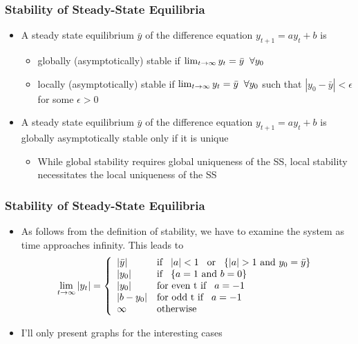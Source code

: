 \documentclass[11pt]{beamer}
\begin{document}
\begin{frame}
\frametitle{Stability of Steady-State Equilibria}
\begin{itemize}\itemsep2ex
	\item A steady state equilibrium $\bar{y}$ of the difference equation $y_{t+1} = a y_t + b$ is
	\begin{itemize}\itemsep2ex
		\item globally (asymptotically) stable if $\lim_{t \to \infty} y_t = \bar{y}  \hspace{0.2cm} \forall y_0$
		\item locally (asymptotically) stable if $\lim_{t \to \infty} y_t = \bar{y}  \hspace{0.2cm} \forall y_0$ such that $|y_0 - \bar{y}| < \epsilon$ for some $\epsilon>0$
	\end{itemize}
	\item A steady state equilibrium $\bar{y}$ of the difference equation $y_{t+1} = a y_t + b$ is globally asymptotically stable only if it is unique
	\begin{itemize}\itemsep2ex
		\item While global stability requires global uniqueness of the SS, local stability necessitates the local uniqueness of the SS
	\end{itemize}
\end{itemize}
\end{frame}


\begin{frame}
\frametitle{Stability of Steady-State Equilibria}
\begin{itemize}\itemsep2ex
	\item As follows from the definition of stability, we have to examine the system as time approaches infinity. This leads to
	\[
	\lim_{t \to \infty} |y_t| =   \left\{
	\begin{array}{ll}
    |\bar{y}| & \text{if} \hspace{0.3cm} |a| < 1 \hspace{0.3cm} \text{or} \hspace{0.3cm} \{|a| >1$ and $y_0=\bar{y}\}\\
    |y_0|  & \text{if} \hspace{0.3cm}  \{a =1$ and $b=0 \} \\
   	|y_0|  & \text{for even t if} \hspace{0.3cm}  a= -1 \\
   	|b-y_0|  & \text{for odd t if} \hspace{0.3cm}  a= -1 \\
   	\infty & \text{otherwise} \\
	\end{array}
	\right.
	\]
	\item I'll only present graphs for the interesting cases
\end{itemize}
\end{frame}
\end{document}
